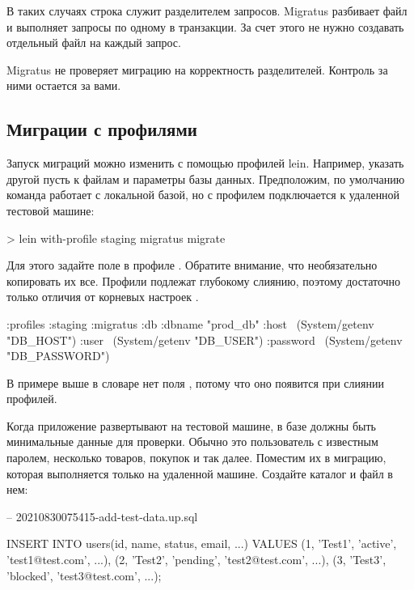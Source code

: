 В таких случаях строка \code{--;;} служит разделителем запросов. Migratus разбивает файл и выполняет запросы по одному в транзакции. За счет этого не нужно создавать отдельный файл на каждый запрос.

Migratus не проверяет миграцию на корректность разделителей. Контроль за ними остается за вами.

\subsection{Миграции с профилями}

Запуск миграций можно изменить с помощью профилей lein. Например, указать другой пусть к файлам и параметры базы данных. Предположим, по умолчанию команда  работает с локальной базой, но с профилем  подключается к удаленной тестовой машине:

\begin{english}
  \begin{bash}
> lein with-profile staging migratus migrate
  \end{bash}
\end{english}

Для этого задайте поле  в профиле . Обратите внимание, что необязательно копировать их все. Профили  подлежат глубокому слиянию, поэтому достаточно только отличия от корневых настроек .

\begin{english}
  \begin{clojure}
{:profiles
 {:staging
  {:migratus
   {:db
     {:dbname "prod_db"
      :host ~(System/getenv "DB_HOST")
      :user ~(System/getenv "DB_USER")
      :password ~(System/getenv "DB_PASSWORD")}}}}}
  \end{clojure}
\end{english}

В примере выше в словаре  нет поля , потому что оно появится при слиянии профилей.

Когда приложение развертывают на тестовой машине, в базе должны быть минимальные данные для проверки. Обычно это пользователь с известным паролем, несколько товаров, покупок и так далее. Поместим их в миграцию, которая выполняется только на удаленной машине. Создайте каталог  и файл в нем:

\begin{english}
  \begin{sql}
-- 20210830075415-add-test-data.up.sql

INSERT INTO users(id, name, status, email, ...)
VALUES
 (1, 'Test1', 'active',  'test1@test.com', ...),
 (2, 'Test2', 'pending', 'test2@test.com', ...),
 (3, 'Test3', 'blocked', 'test3@test.com', ...);
  \end{sql}
\end{english}

